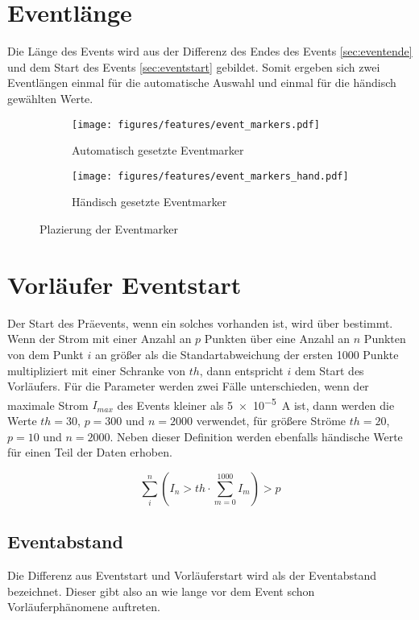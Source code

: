 \section{Eventlänge}
\label{sec:eventlen}
Die Länge des Events wird aus der Differenz des Endes des Events \ref{sec:eventende} und dem Start des Events \ref{sec:eventstart} gebildet. Somit ergeben sich zwei Eventlängen einmal für die automatische Auswahl und einmal für die händisch gewählten Werte. 
\begin{figure}[H]
  \centering
  \begin{subfigure}[t]{0.48\textwidth}
    \centering
    \texttt{[image: figures/features/event\_markers.pdf]}
    \caption{Automatisch gesetzte Eventmarker} 
    \label{fig:event_markers_auto}
  \end{subfigure}
  \begin{subfigure}[t]{0.48\textwidth}
    \centering
    \texttt{[image: figures/features/event\_markers\_hand.pdf]}
    \caption{Händisch gesetzte Eventmarker}
    \label{fig:event_markers_hand}
  \end{subfigure}
  \caption{Plazierung der Eventmarker}
  \label{fig:event_markers}
\end{figure}


\section{Vorläufer Eventstart}
\label{sec:preeventstart}
Der Start des Präevents, wenn ein solches vorhanden ist, wird über  bestimmt. Wenn der Strom mit einer Anzahl an \(p\) Punkten über eine Anzahl an \(n\) Punkten von dem Punkt \(i\) an größer als die Standartabweichung der ersten 1000 Punkte multipliziert mit einer Schranke von \(th\), dann entspricht \(i\) dem Start des Vorläufers. Für die Parameter werden zwei Fälle unterschieden, wenn der maximale Strom \(I_{max}\) des Events kleiner als \SI{5e-5}{\ampere} ist, dann werden die Werte \(th = 30\), \(p = 300\) und \(n = 2000\) verwendet, für größere Ströme \(th = 20\), \(p = 10\) und \(n=2000\). Neben dieser Definition werden ebenfalls händische Werte für einen Teil der Daten erhoben.

\begin{equation}
  \sum_i^n (I_n > th \cdot \sum_{m=0}^{1000} I_m) > p 
  \label{eq:preevent_start} 
\end{equation}

\subsection{Eventabstand}
\label{sec:event_distance}
Die Differenz aus Eventstart und Vorläuferstart wird als der Eventabstand bezeichnet. Dieser gibt also an wie lange vor dem Event schon Vorläuferphänomene auftreten.

